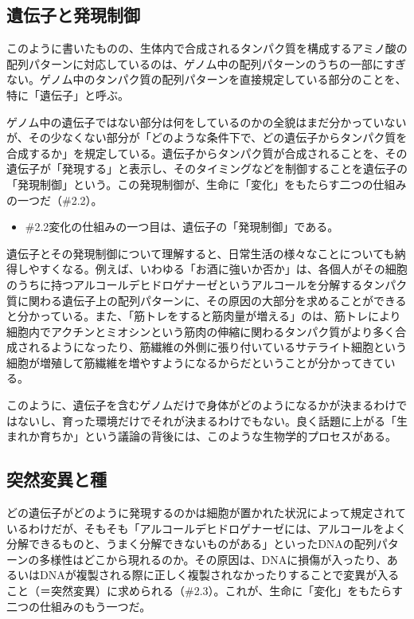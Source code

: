 \subsection{遺伝子と発現制御}\label{ux907aux4f1dux5b50ux3068ux767aux73feux5236ux5fa1}

このように書いたものの、生体内で合成されるタンパク質を構成するアミノ酸の配列パターンに対応しているのは、ゲノム中の配列パターンのうちの一部にすぎない。ゲノム中のタンパク質の配列パターンを直接規定している部分のことを、特に「遺伝子」と呼ぶ。

ゲノム中の遺伝子ではない部分は何をしているのかの全貌はまだ分かっていないが、その少なくない部分が「どのような条件下で、どの遺伝子からタンパク質を合成するか」を規定している。遺伝子からタンパク質が合成されることを、その遺伝子が「発現する」と表示し、そのタイミングなどを制御することを遺伝子の「発現制御」という。この発現制御が、生命に「変化」をもたらす二つの仕組みの一つだ（\#2.2）。

\begin{note}{}
  \begin{itemize}
    \tightlist
    \item{\#2.2}変化の仕組みの一つ目は、遺伝子の「発現制御」である。
  \end{itemize}
\end{note}

遺伝子とその発現制御について理解すると、日常生活の様々なことについても納得しやすくなる。例えば、いわゆる「お酒に強いか否か」は、各個人がその細胞のうちに持つアルコールデヒドロゲナーゼというアルコールを分解するタンパク質に関わる遺伝子上の配列パターンに、その原因の大部分を求めることができると分かっている。また、「筋トレをすると筋肉量が増える」のは、筋トレにより細胞内でアクチンとミオシンという筋肉の伸縮に関わるタンパク質がより多く合成されるようになったり、筋繊維の外側に張り付いているサテライト細胞という細胞が増殖して筋繊維を増やすようになるからだということが分かってきている。

このように、遺伝子を含むゲノムだけで身体がどのようになるかが決まるわけではないし、育った環境だけでそれが決まるわけでもない。良く話題に上がる「生まれか育ちか」という議論の背後には、このような生物学的プロセスがある。

\subsection{突然変異と種}\label{ux7a81ux7136ux5909ux7570ux3068ux7a2e}

どの遺伝子がどのように発現するのかは細胞が置かれた状況によって規定されているわけだが、そもそも「アルコールデヒドロゲナーゼには、アルコールをよく分解できるものと、うまく分解できないものがある」といったDNAの配列パターンの多様性はどこから現れるのか。その原因は、DNAに損傷が入ったり、あるいはDNAが複製される際に正しく複製されなかったりすることで変異が入ること（＝突然変異）に求められる（\#2.3）。これが、生命に「変化」をもたらす二つの仕組みのもう一つだ。

